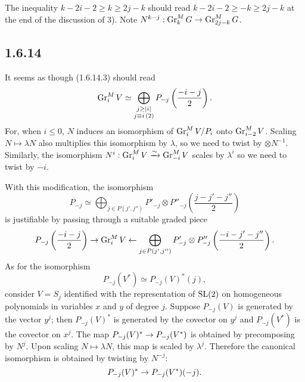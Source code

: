 \documentclass[deligne.tex]{subfiles}
\begin{document}
The inequality $k-2i-2\geq k\geq2j-k$ should read $k-2i-2\geq-k\geq2j-k$
at the end of the discussion of 3). Note $N^{k-j}:\operatorname{Gr}_k^MG\rightarrow\operatorname{Gr}_{2j-k}^MG$.

\subsection*{1.6.14}\label{weilii:1.6.14}
It seems as though (1.6.14.3) should read
\begin{equation*}
	\operatorname{Gr}_i^MV\simeq\bigoplus_{\substack{j\geq|i|\\j\equiv i\,(2)}}
	P_{-j}\left(\frac{-i-j}2\right).
\end{equation*}
For, when $i\leq0$, $N$ induces an isomorphism of $\operatorname{Gr}_i^MV/P_i$ onto
$\operatorname{Gr}_{i-2}^MV$. Scaling $N\mapsto\lambda N$ also multiplies this isomorphism
by $\lambda$, so we need to twist by $\otimes N^{-1}$. Similarly, the
isomorphism $N^i:\operatorname{Gr}_i^MV\xrightarrow{\sim}\operatorname{Gr}_{-i}^MV$ scales by
$\lambda^i$ so we need to twist by $-i$.

With this modification, the isomorphism
\begin{equation*}
	P_{-j}\simeq\bigoplus_{j\in P(j',j'')}P'_{-j}\otimes P''_{-j}
	\left(\frac{j-j'-j''}2\right)
\end{equation*}
is justifiable by passing through a suitable graded piece
\begin{equation*}
	P_{-j}\left(\frac{-i-j}2\right)\rightarrow\operatorname{Gr}_i^MV\leftarrow\bigoplus_{j\in P(j',j'')}P'_{-j}\otimes P''_{-j}
	\left(\frac{-i-j'-j''}2\right).
\end{equation*}
As for the isomorphism
\begin{equation*}
 	P_{-j}(V^\ast)\simeq P_{-j}(V)^\ast(j),
\end{equation*}
consider $V=S_j$ identified with the representation of $\operatorname{SL}(2)$ on
homogeneous polynomials in variables $x$ and $y$ of degree $j$. Suppose
$P_{-j}(V)$ is generated by the vector $y^j$; then $P_{-j}(V)^\ast$ is 
generated by the covector on $y^j$ and $P_{-j}(V^\ast)$ is the covector
on $x^j$. The map $P_{-j}(V)^\ast\rightarrow P_{-j}(V^\ast)$ is obtained by
precomposing by $N^j$. Upon scaling $N\mapsto\lambda N$, this map is scaled
by $\lambda^j$. Therefore the canonical isomorphism is obtained by
twisting by $N^{-j}$:
\begin{equation*}
	P_{-j}(V)^\ast\rightarrow P_{-j}(V^\ast)(-j).
\end{equation*}
\end{document}
